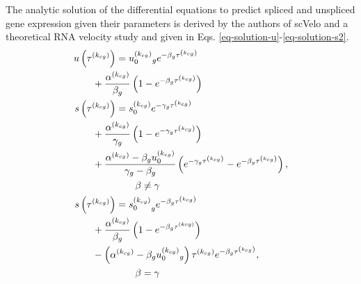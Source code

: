 \documentclass[
  sn-mathphys-num,
  lineno,
  twocolumn]{sn-jnl}
\begin{document}
The analytic solution of the differential equations to predict spliced
and unspliced gene expression given their parameters is derived by the
authors of scVelo and a theoretical RNA velocity study
\citep{Bergen2020-pj, Li2021-qa} and given in Eqs.
\ref{eq-solution-u}-\ref{eq-solution-s2}. \begin{align}
u\left(\tau^{\left(k_{c g}\right)}\right) 
  &= u_0^{\left(k_{c g}\right)}{ }_g e^{-\beta_g \tau^{\left(k_{c g}\right)}} 
  \nonumber \\
&\hskip -24pt + \frac{\alpha^{\left(k_{c g}\right)}}
  {\beta_g}\left(1-e^{-\beta_g \tau^{\left(k_{c g}\right)}}\right) 
  \label{eq-solution-u}\\
s\left(\tau^{\left(k_{c g}\right)}\right) 
  &= s_0^{\left(k_{c g}\right)} e^{-\gamma_g \tau^{\left(k_{c g}\right)}} 
  \nonumber \\
  &\hskip -24pt + \frac{\alpha^{\left(k_{c g}\right)}}{\gamma_g}
    \left(1-e^{-\gamma_g \tau^{\left(k_{c g}\right)}}\right) 
    \nonumber\\
  &\hskip -24pt + \frac{\alpha^{\left(k_{c g}\right)}-\beta_g u_0^{\left(k_{c g}\right)}}
    {\gamma_g-\beta_g}\left(e^{-\gamma_g \tau^{\left(k_{c g}\right)}}
    -e^{-\beta_g \tau^{\left(k_{c g}\right)}}\right), 
    \nonumber \\
  &\qquad \beta \neq \gamma \label{eq-solution-s} \\
s\left(\tau^{\left(k_{c g}\right)}\right) 
  &= {s_0^{\left(k_{c g}\right)}}_g e^{-\beta_g \tau^{\left(k_{c g}\right)}} \nonumber \\
  &\hskip -24pt +\frac{\alpha^{\left(k_{c g}\right)}}{\beta_g}
  \left(1-e^{-\beta_g \tau^{(k c g)}}\right) 
  \nonumber \\
  &\hskip -24pt -\left(\alpha^{\left(k_{c g}\right)}
  -\beta_g u_0^{\left(k_{c g}\right)}{ }_g\right) \tau^{\left(k_{c g}\right)} 
  e^{-\beta_g \tau^{\left(k_{c g}\right)}}, \nonumber \\
  &\qquad \beta = \gamma \label{eq-solution-s2}
\end{align}
\end{document}
